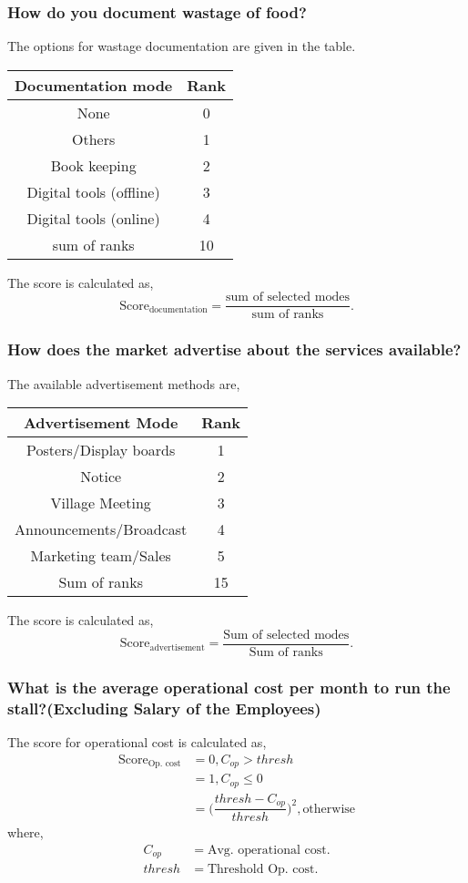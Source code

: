 \documentclass[oneside,twocolumn]{article}
\newcommand{\tsub}[2]{\text{#1}_{\text{#2}}}
\newenvironment{ttable}
               {\begin{center}
                 \begin{tabular}{c|c}
                   \hline
                   }
                   { \\ \hline
                 \end{tabular}
               \end{center}
               }
\begin{document}
\subsubsection{How do you document wastage of food?}
The options for wastage documentation are given in the table.
\begin{center}
  \begin{tabular}{c | c}
    \hline
    Documentation mode & Rank \\ \hline
    None & 0 \\
    Others & 1 \\
    Book keeping & 2 \\
    Digital tools (offline) & 3 \\
    Digital tools (online) & 4 \\ \hline
    sum of ranks & 10 \\ \hline
  \end{tabular}
\end{center}

The score is calculated as,
\[
\text{Score}_{\text{documentation}} = \dfrac{\text{sum of selected modes}}{\text{sum of ranks}}.
\]

\subsubsection{How does the market advertise about the services available?}
The available advertisement methods are,
\begin{ttable}
  Advertisement Mode & Rank \\ \hline
  Posters/Display boards & 1 \\
  Notice & 2 \\
  Village Meeting & 3 \\
  Announcements/Broadcast & 4 \\
  Marketing team/Sales & 5 \\ \hline
  Sum of ranks & 15
\end{ttable}

The score is calculated as,
\[
\tsub{Score}{advertisement} = \dfrac{\text{Sum of selected modes}}{\text{Sum of ranks}}.
\]

\subsubsection{What is the average operational cost per month to run the
  stall?(Excluding Salary of the Employees)}
The score for operational cost is calculated as,
\begin{align*}
  \tsub{Score}{Op. cost} &= 0, C_{op} > thresh \\
  &= 1, C_{op} \le 0 \\
  &= \Big(\dfrac{thresh - C_{op}}{thresh}\Big)^2, \text{otherwise}
\end{align*}
where,
\begin{align*}
  C_{op} &= \text{Avg. operational cost}. \\
  thresh &= \text{Threshold Op. cost}.
\end{align*}
\end{document}

